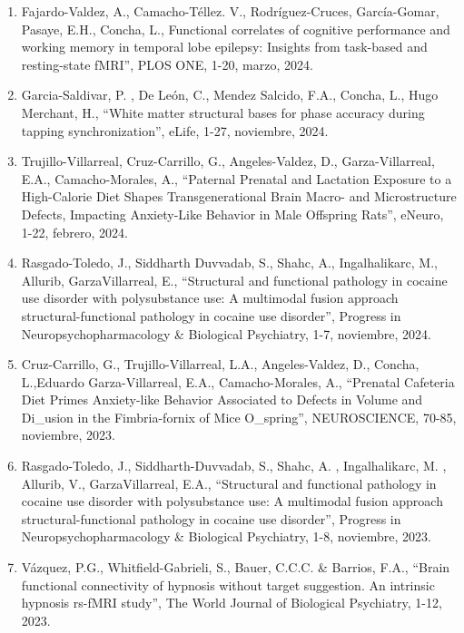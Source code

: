 \begin{enumerate}
\item Fajardo-Valdez, A., Camacho-Téllez. V., Rodríguez-Cruces, García-Gomar, Pasaye, E.H., 
Concha, L., 
Functional correlates of cognitive performance and working memory in temporal lobe epilepsy: 
Insights from task-based and resting-state fMRI”, PLOS ONE, 1-20, marzo, 2024.

\item Garcia-Saldivar, P. , De León, C., Mendez Salcido, F.A., Concha, L., Hugo Merchant, H., 
“White 
matter structural bases for phase accuracy during tapping synchronization”, eLife, 1-27, noviembre, 2024.

\item Trujillo-Villarreal, Cruz-Carrillo, G., Angeles-Valdez, D., Garza-Villarreal, E.A., 
Camacho-Morales, A., “Paternal Prenatal and Lactation Exposure to a High-Calorie Diet Shapes 
Transgenerational Brain Macro- and Microstructure Defects, Impacting Anxiety-Like Behavior in Male 
Offspring Rats”, eNeuro, 1-22, febrero, 2024.

\item Rasgado-Toledo, J., Siddharth Duvvadab, S., Shahc, A., Ingalhalikarc, M., Allurib, 
GarzaVillarreal, E., “Structural and functional pathology in cocaine use disorder with polysubstance 
use: A multimodal fusion approach structural-functional pathology in cocaine use disorder”, Progress 
in Neuropsychopharmacology & Biological Psychiatry, 1-7, noviembre, 2024.

\item Cruz-Carrillo, G., Trujillo-Villarreal, L.A., Angeles-Valdez, D., Concha, L.,Eduardo 
Garza-Villarreal, E.A., Camacho-Morales, A., “Prenatal Cafeteria Diet Primes Anxiety-like Behavior 
Associated to Defects in Volume and Di_usion in the Fimbria-fornix of Mice O_spring”, NEUROSCIENCE, 
70-85, noviembre, 2023.

\item Rasgado-Toledo, J., Siddharth-Duvvadab, S., Shahc, A. , Ingalhalikarc, M. , Allurib, V., 
GarzaVillarreal, E.A., “Structural and functional pathology in cocaine use disorder with 
polysubstance use: A multimodal fusion approach structural-functional pathology in cocaine use 
disorder”, Progress in Neuropsychopharmacology & Biological Psychiatry, 1-8, noviembre, 2023.

\item Vázquez, P.G., Whitfield-Gabrieli, S., Bauer, C.C.C. & Barrios, F.A., “Brain functional 
connectivity of hypnosis without target suggestion. An intrinsic hypnosis rs-fMRI study”, The World 
Journal of Biological Psychiatry, 1-12, 2023.


\end{enumerate}
